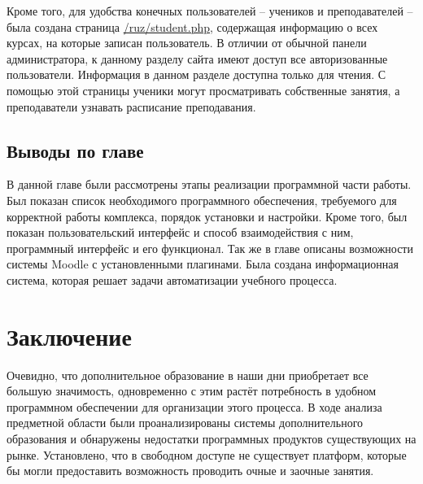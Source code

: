 \documentclass[a4paper,14pt]{article}
\begin{document}
Кроме того, для удобства конечных пользователей -- учеников и преподавателей -- была создана страница \url{/ruz/student.php}, содержащая информацию о всех курсах, на которые записан пользователь.
В отличии от обычной панели администратора, к данному разделу сайта имеют доступ все авторизованные пользователи.
Информация в данном разделе доступна только для чтения.
С помощью этой страницы ученики могут просматривать собственные занятия, а преподаватели узнавать расписание преподавания.



\subsection{Выводы по главе}

В данной главе были рассмотрены этапы реализации программной части работы.
Был показан список необходимого программного обеспечения, требуемого для корректной работы комплекса, порядок установки и настройки.
Кроме того, был показан пользовательский интерфейс и способ взаимодействия с ним, программный интерфейс и его функционал.
Так же в главе описаны возможности системы Moodle с установленными плагинами.
Была создана информационная система, которая решает задачи автоматизации учебного процесса.



\section{Заключение}


Очевидно, что дополнительное образование в наши дни приобретает все большую значимость, одновременно с этим растёт потребность в удобном программном обеспечении для организации этого процесса.
В ходе анализа предметной области были проанализированы системы дополнительного образования и обнаружены недостатки программных продуктов существующих на рынке.
Установлено, что в свободном доступе не существует платформ, которые бы могли предоставить возможность проводить очные и заочные занятия.
\end{document}
